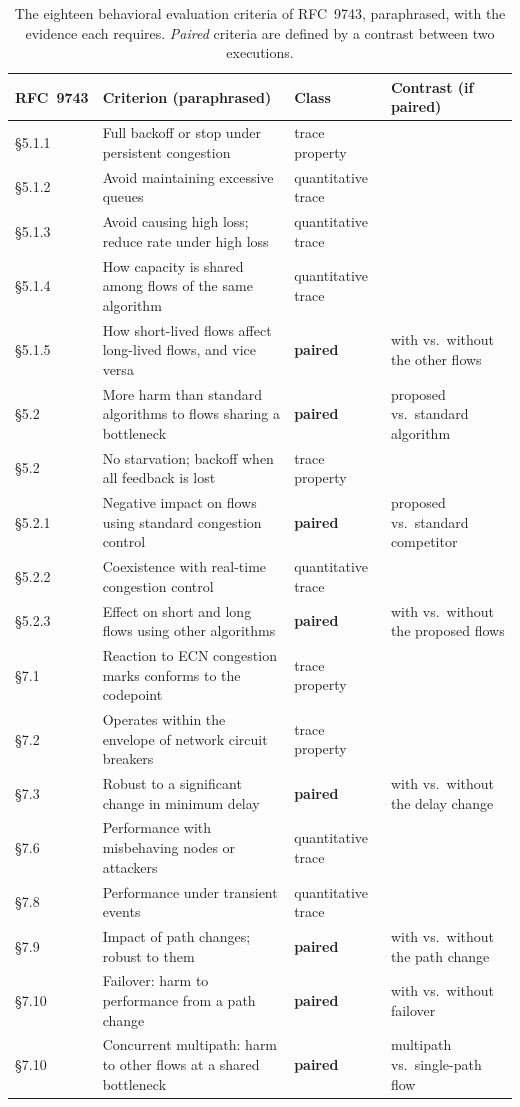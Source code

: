 \documentclass[conference]{IEEEtran}
\begin{document}
	\begin{table}[t]
		\caption{The eighteen behavioral evaluation criteria of RFC~9743, paraphrased, with the evidence each requires. \emph{Paired} criteria are defined by a contrast between two executions.}
		\label{tab:audit}
		\centering
		\scriptsize
		\begin{tabular}{@{}llll@{}}
			\toprule
			RFC~9743 & Criterion (paraphrased) & Class & Contrast (if paired) \\
			\midrule
			\S5.1.1 & Full backoff or stop under persistent congestion & trace property & \\
			\S5.1.2 & Avoid maintaining excessive queues & quantitative trace & \\
			\S5.1.3 & Avoid causing high loss; reduce rate under high loss & quantitative trace & \\
			\S5.1.4 & How capacity is shared among flows of the same algorithm & quantitative trace & \\
			\S5.1.5 & How short-lived flows affect long-lived flows, and vice versa & \textbf{paired} & with vs.\ without the other flows \\
			\S5.2 & More harm than standard algorithms to flows sharing a bottleneck & \textbf{paired} & proposed vs.\ standard algorithm \\
			\S5.2 & No starvation; backoff when all feedback is lost & trace property & \\
			\S5.2.1 & Negative impact on flows using standard congestion control & \textbf{paired} & proposed vs.\ standard competitor \\
			\S5.2.2 & Coexistence with real-time congestion control & quantitative trace & \\
			\S5.2.3 & Effect on short and long flows using other algorithms & \textbf{paired} & with vs.\ without the proposed flows \\
			\S7.1 & Reaction to ECN congestion marks conforms to the codepoint & trace property & \\
			\S7.2 & Operates within the envelope of network circuit breakers & trace property & \\
			\S7.3 & Robust to a significant change in minimum delay & \textbf{paired} & with vs.\ without the delay change \\
			\S7.6 & Performance with misbehaving nodes or attackers & quantitative trace & \\
			\S7.8 & Performance under transient events & quantitative trace & \\
			\S7.9 & Impact of path changes; robust to them & \textbf{paired} & with vs.\ without the path change \\
			\S7.10 & Failover: harm to performance from a path change & \textbf{paired} & with vs.\ without failover \\
			\S7.10 & Concurrent multipath: harm to other flows at a shared bottleneck & \textbf{paired} & multipath vs.\ single-path flow \\
			\bottomrule
		\end{tabular}
	\end{table}
	
\end{document}
